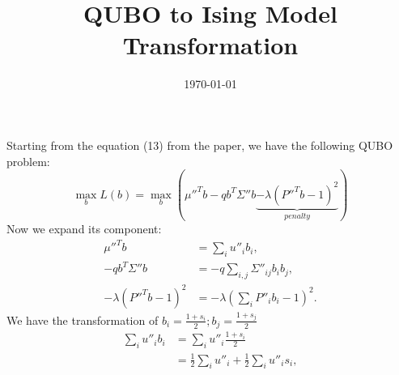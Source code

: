 \documentclass{article}
\title{QUBO to Ising Model Transformation}
\author{}
\date{\today}
\begin{document}
\maketitle
Starting from the equation (13) from the paper, we have the following QUBO problem:
\begin{equation}
\max_{b} L(b) = \max_{b} \left(\mu''^Tb -qb^T\Sigma''b \underbrace{- \lambda(P''^T b-1)^2}_{penalty}\right)
\end{equation}
Now we expand its component:
    \begin{align}
        \mu''^Tb &= \sum_{i}^{} u''_i b_i, \\
         -qb^T\Sigma''b &= -q \sum_{i,j}^{} \Sigma''_{ij} b_i b_j, \\
            -\lambda(P''^T b-1)^2 &= -\lambda \left(\sum_{i}^{} P''_i b_i - 1\right)^2.
    \end{align}
We have the transformation of \(b_i = \frac{1+s_i}{2}; b_j = \frac{1+s_j}{2}\)
\begin{align}
     \sum_{i}^{} u''_i b_i &= \sum_{i}^{} u''_i \frac{1+s_i}{2} \\
     &= \frac{1}{2} \sum_{i}^{} u''_i + \frac{1}{2} \sum_{i}^{} u''_i s_i, \\
\end{align}
\end{document}
